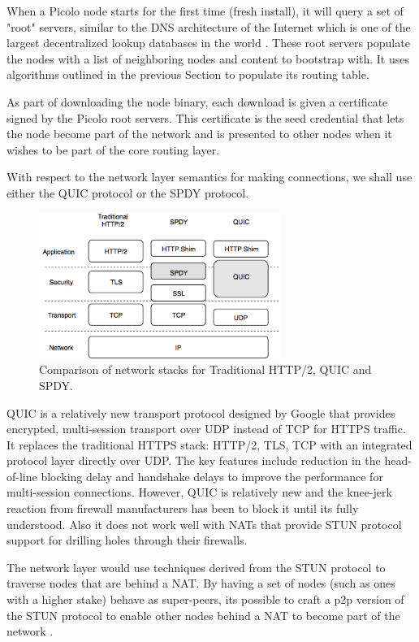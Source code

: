 When a Picolo node starts for the first time (fresh install), it will query a set of "root" servers, similar to the DNS
architecture of the Internet which is one of the largest decentralized lookup databases in the world \cite{icann_root}. 
These root servers populate the nodes with a list of neighboring nodes and content to bootstrap with. It uses algorithms
outlined in the previous Section to populate its routing table.

As part of downloading the node binary, each download is given a certificate signed by the Picolo root servers. This
certificate is the seed credential that lets the node become part of the network and is presented to other nodes when it
wishes to be part of the core routing layer.

With respect to the network layer semantics for making connections, we shall use either the QUIC protocol or the SPDY
protocol.
\begin{figure}[h]
    \centering
    \includegraphics[width=0.7\textwidth]{fig/pic_netlayer.png}
  \caption{Comparison of network stacks for Traditional HTTP/2, QUIC and SPDY.}
\end{figure}

QUIC is a relatively new transport protocol designed by Google \cite{quic_sigcomm} that provides encrypted, multi-session transport over UDP
instead of TCP for HTTPS traffic. It replaces the traditional HTTPS stack: HTTP/2, TLS, TCP with an integrated protocol
layer directly over UDP. The key features include reduction in the head-of-line blocking delay and handshake delays to
improve the performance for multi-session connections. However, QUIC is relatively new and the knee-jerk reaction from
firewall manufacturers has been to block it until its fully understood. Also it does not work well with NATs that
provide STUN protocol \cite{stun_protocol} support for drilling holes through their firewalls.  

The network layer would use techniques derived from the STUN protocol to traverse nodes
that are behind a NAT. By having a set of nodes (such as ones with a higher stake) behave as
super-peers, its possible to craft a p2p version of the STUN protocol to enable
other nodes behind a NAT to become part of the network \cite{p2p_nat}.

